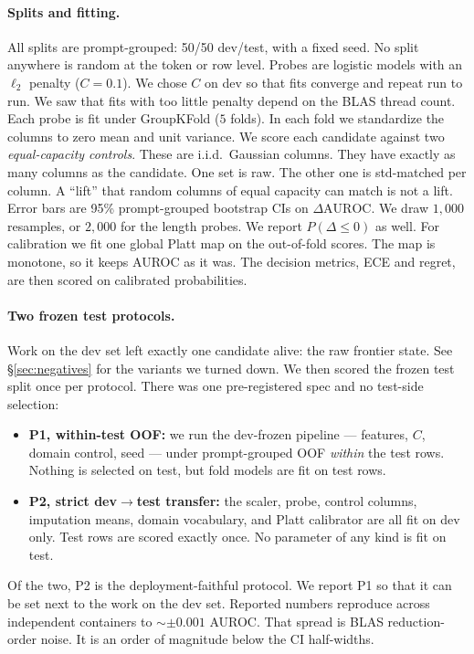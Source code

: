 \documentclass[11pt]{article}
\newcommand{\deltaAUROC}{\ensuremath{\Delta\mathrm{AUROC}}}
\newcommand{\pdle}{\ensuremath{P(\Delta\le 0)}}
\begin{document}
\paragraph{Splits and fitting.} All splits are prompt-grouped: 50/50 dev/test,
with a fixed seed. No split anywhere is random at the token or row level.
Probes are logistic models with an $\ell_2$ penalty ($C{=}0.1$). We chose $C$
on dev so that fits converge and repeat run to run. We saw that fits with too
little penalty depend on the BLAS thread count. Each probe is fit under
GroupKFold ($5$ folds). In each fold we standardize the columns to zero mean
and unit variance. We score each candidate against two
\emph{equal-capacity controls}. These are i.i.d.\ Gaussian columns. They have
exactly as many columns as the candidate. One set is raw. The other one is
std-matched per column. A ``lift'' that random columns of equal capacity can
match is not a lift. Error bars are 95\% prompt-grouped bootstrap CIs on
\deltaAUROC{}. We draw $1{,}000$ resamples, or $2{,}000$ for the length
probes. We report \pdle{} as well. For calibration we fit one global Platt map
on the out-of-fold scores. The map is monotone, so it keeps AUROC as it was.
The decision metrics, ECE and regret, are then scored on calibrated
probabilities.

\paragraph{Two frozen test protocols.} Work on the dev set left exactly one
candidate alive: the raw frontier state. See \S\ref{sec:negatives} for the
variants we turned down. We then scored the frozen test split once per
protocol. There was one pre-registered spec and no test-side selection:
\begin{itemize}
\item \textbf{P1, within-test OOF:} we run the dev-frozen pipeline ---
features, $C$, domain control, seed --- under prompt-grouped OOF \emph{within}
the test rows. Nothing is selected on test, but fold models are fit on test
rows.
\item \textbf{P2, strict dev$\to$test transfer:} the scaler, probe, control
columns, imputation means, domain vocabulary, and Platt calibrator are all fit
on dev only. Test rows are scored exactly once. No parameter of any kind is
fit on test.
\end{itemize}
Of the two, P2 is the deployment-faithful protocol. We report P1 so that it
can be set next to the work on the dev set. Reported numbers reproduce across
independent containers to ${\sim}{\pm}0.001$ AUROC. That spread is BLAS
reduction-order noise. It is an order of magnitude below the CI half-widths.
\end{document}
